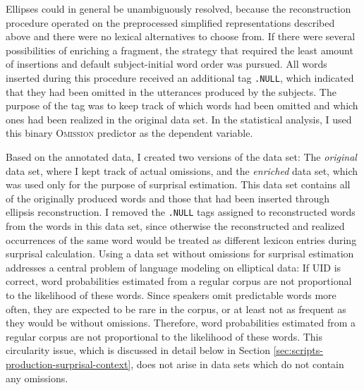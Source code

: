 Ellipses could in general be unambiguously resolved, because the reconstruction procedure operated on the preprocessed simplified representations described above and there were no lexical alternatives to choose from. If there were several possibilities of enriching a fragment, the strategy that required the least amount of insertions and default subject-initial word order was pursued. All words inserted during this procedure received an additional tag \texttt{.NULL}, which indicated that they had been omitted in the utterances produced by the subjects. The purpose of the tag was to keep track of which words had been omitted and which ones had been realized in the original data set. In the statistical analysis, I used this binary \textsc{Omission} predictor as the dependent variable.

Based on the annotated data, I created two versions of the data set: The \textit{original} data set, where I kept track of actual omissions, and the \textit{enriched} data set, which was used only for the purpose of surprisal estimation. This data set contains all of the originally produced words and those that had been inserted through ellipsis reconstruction. I removed the \texttt{.NULL} tags assigned to reconstructed words from the words in this data set, since otherwise the reconstructed and realized occurrences of the same word would be treated as different lexicon entries during surprisal calculation. Using a data set without omissions for surprisal estimation addresses a central problem of language modeling on elliptical data: If UID is correct, word probabilities estimated from a regular corpus are not proportional to the likelihood of these words. Since speakers omit predictable words more often, they are expected to be rare in the corpus, or at least not as frequent as they would be without omissions. Therefore, word probabilities estimated from a regular corpus are not proportional to the likelihood of these words. This circularity issue, which is discussed in detail below in Section \ref{sec:scripts-production-surprisal-context}, does not arise in data sets which do not contain any omissions.

